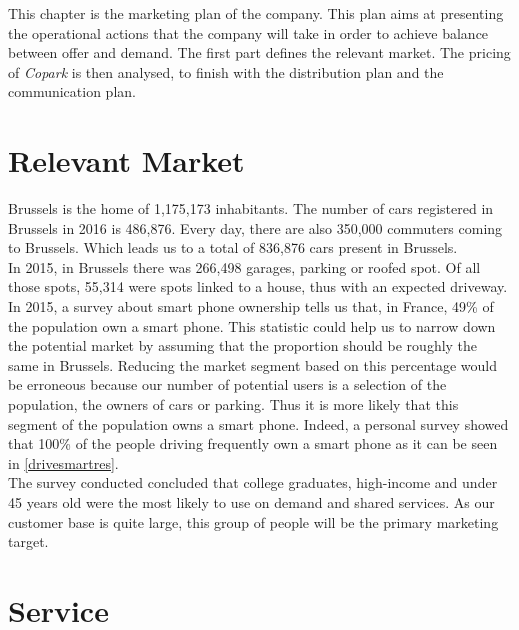 \documentclass[12pt,a4paper,oneside]{book}
\newcommand{\bp}{\textit{Copark}}
\begin{document}
This chapter is the marketing plan of the company. This plan aims at presenting the operational actions that the company will take in order to achieve balance between offer and demand. The first part defines the relevant market. The pricing of \bp{} is then analysed, to finish with the distribution plan and the communication plan.\\

\section{Relevant Market}
\label{rmar}
Brussels is the home of 1,175,173 inhabitants.\cite{ciafb} The number of cars registered in Brussels in 2016 is 486,876. Every day, there are also 350,000 commuters coming to Brussels.\cite{bxcommu} Which leads us to a total of 836,876 cars present in Brussels.\\

In 2015, in Brussels there was 266,498 garages, parking or roofed spot. Of all those spots, 55,314 were spots linked to a house, thus with an expected driveway.\\

In 2015, a survey about smart phone ownership tells us that, in France, 49\% of the population own a smart phone. This statistic could help us to narrow down the potential market by assuming that the proportion should be roughly the same in Brussels. Reducing the market segment based on this percentage would be erroneous because our number of potential users is a selection of the population, the owners of cars or parking. Thus it is more likely that this segment of the population owns a smart phone. Indeed, a personal survey showed that 100\% of the people driving frequently own a smart phone as it can be seen in \autoref{drivesmartres}.\\

The survey conducted concluded that college graduates, high-income and under 45 years old were the most likely to use on demand and shared services. As our customer base is quite large, this group of people will be the primary marketing target.

\section{Service}
\end{document}
